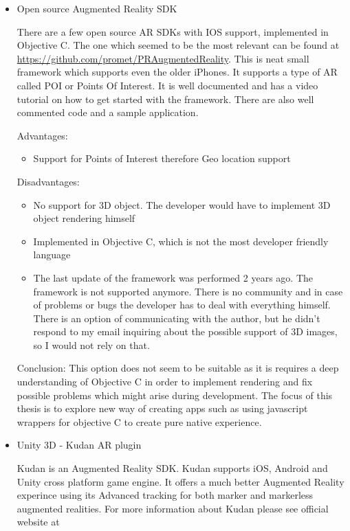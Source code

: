 \documentclass[thesis=M,english]{FITthesis}[2012/10/20]
\begin{document}
\begin{itemize}
	\item{Open source Augmented Reality SDK}
	
	There are a few open source AR SDKs with IOS support, implemented in Objective C. The one which seemed to be the most relevant can be found at  \url{https://github.com/promet/PRAugmentedReality}. This is neat small framework which supports even the older iPhones. It supports a type of AR called POI or Points Of Interest. It is well documented and has a video tutorial on how to get started with the framework. There are also well commented code and a sample application.
	
	Advantages:
	\begin{itemize}
		\item{Support for Points of Interest} therefore Geo location support
	\end{itemize}
	
	Disadvantages:
	\begin{itemize}
		\item{No support for 3D object. The developer would have to implement 3D object rendering himself}
		\item{Implemented in Objective C, which is not the most developer friendly language}
		\item{The last update of the framework was performed 2 years ago. The framework is not supported anymore. There is no community and in case of problems or bugs the developer has to deal with everything himself. There is an option of communicating with the author, but he didn't respond to my email inquiring about the possible support of 3D images, so I would not rely on that.}
	\end{itemize}

	Conclusion:
	This option does not seem to be suitable as it is requires a deep understanding of Objective C in order to implement rendering and fix possible problems which might arise during development. The focus of this thesis is to explore new way of creating apps such as using javascript wrappers for objective C to create pure native experience.

	\item{Unity 3D - Kudan AR plugin}
	
	Kudan is an Augmented Reality SDK.  Kudan supports iOS, Android and Unity cross platform game engine. It offers a much better Augmented Reality experince using its Advanced tracking for both marker and markerless augmented realities. For more information about Kudan please see official website at \cite{kudan}
	

\end{itemize}
\end{document}
